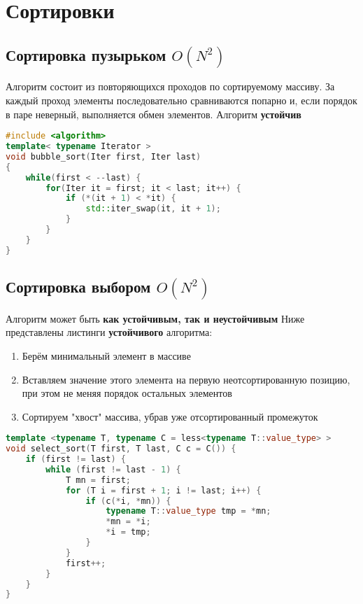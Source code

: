 \chapter{Сортировки}
\section{Сортировка пузырьком $O(N^2)$}
Алгоритм состоит из повторяющихся проходов по сортируемому массиву. За каждый проход элементы последовательно сравниваются попарно и, если порядок в паре неверный, выполняется обмен элементов. \newline
Алгоритм \textbf{устойчив}

\begin{lstlisting}[language=C++]
#include <algorithm>
template< typename Iterator >
void bubble_sort(Iter first, Iter last)
{
    while(first < --last) {
        for(Iter it = first; it < last; it++) {
            if (*(it + 1) < *it) {
            	std::iter_swap(it, it + 1);
            }
		}
	}
}
\end{lstlisting}

\section{Сортировка выбором $O(N^2)$}
Алгоритм может быть \textbf{как устойчивым, так и неустойчивым}
Ниже представлены листинги \textbf{устойчивого} алгоритма:
\begin{enumerate}
\item Берём минимальный элемент в массиве
\item Вставляем значение этого элемента на первую неотсортированную позицию, при этом не меняя порядок остальных элементов
\item Сортируем "хвост" массива, убрав уже отсортированный промежуток
\end{enumerate}
\begin{lstlisting}[language=C++]
template <typename T, typename C = less<typename T::value_type> >
void select_sort(T first, T last, C c = C()) {
	if (first != last) {
        while (first != last - 1) {
            T mn = first;
            for (T i = first + 1; i != last; i++) {
                if (c(*i, *mn)) {
                    typename T::value_type tmp = *mn;
                    *mn = *i;
                    *i = tmp;
                }
            }
            first++;
        }
    }
}
\end{lstlisting}